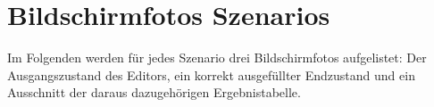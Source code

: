 \chapter{Bildschirmfotos Szenarios}
\label{app:scenarios}

Im Folgenden werden für jedes Szenario drei Bildschirmfotos aufgelistet: Der Ausgangszustand des Editors, ein korrekt ausgefüllter Endzustand und ein Ausschnitt der daraus dazugehörigen Ergebnistabelle.
